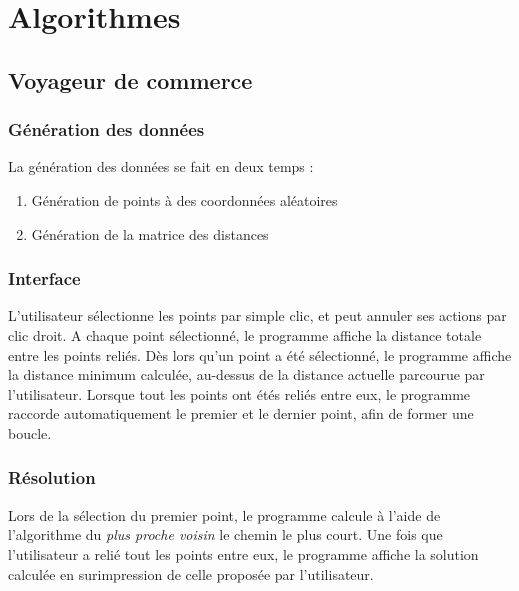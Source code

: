 \section{Algorithmes}
    \subsection{Voyageur de commerce}
        \subsubsection{Génération des données}
            La génération des données se fait en deux temps :
            \begin{enumerate}
                \item Génération de points à des coordonnées aléatoires
                \item Génération de la matrice des distances
            \end{enumerate}
        \subsubsection{Interface}
            L'utilisateur sélectionne les points par simple clic,
            et peut annuler ses actions par clic droit.
            A chaque point sélectionné, le programme
            affiche la distance totale entre les points reliés.
            Dès lors qu'un point a été sélectionné, le programme
            affiche la distance minimum calculée, au-dessus de
            la distance actuelle parcourue par l'utilisateur.
            Lorsque tout les points ont étés reliés entre eux,
            le programme raccorde automatiquement le premier
            et le dernier point, afin de former une boucle.
        \subsubsection{Résolution}
            Lors de la sélection du premier point,
            le programme calcule à l'aide de l'algorithme
            du \emph{plus proche voisin} le chemin le plus court.
            Une fois que l'utilisateur a relié tout les points
            entre eux, le programme affiche la solution calculée
            en surimpression de celle proposée par l'utilisateur.
